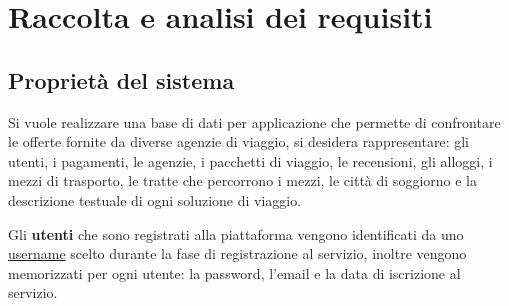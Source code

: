 \section{Raccolta e analisi dei requisiti}
\subsection{Proprietà del sistema}

%
%
Si vuole realizzare una base di dati per applicazione che permette di confrontare le offerte fornite da diverse agenzie di viaggio, si desidera rappresentare: gli utenti, i pagamenti, le agenzie, i pacchetti di viaggio, le recensioni, gli alloggi, i mezzi di trasporto, le tratte che percorrono i mezzi, le città di soggiorno e la descrizione testuale di ogni soluzione di viaggio.

%
%
Gli \textbf{utenti} che sono registrati alla piattaforma vengono identificati da uno \underline{username} scelto durante la fase di registrazione al servizio, inoltre vengono memorizzati per ogni utente: la password, l'email e la data di iscrizione al servizio.

